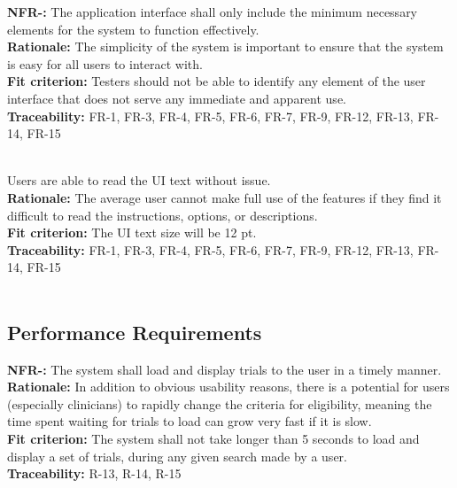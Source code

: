 \documentclass[12pt, titlepage]{article}
\newcounter{NFR_Counter}
\newcounter{FR_Counter}
\begin{document}
\noindent\textbf{NFR-\the\value{NFR_Counter}:}
The application interface shall only include the minimum necessary elements for the system to function effectively. \\
\textbf{Rationale:}
The simplicity of the system is important to ensure that the system is easy for all users to interact with. \\
\textbf{Fit criterion:}
Testers should not be able to identify any element of the user interface that does not serve any immediate and apparent use. \\
\textbf{Traceability:}
FR-1, FR-3, FR-4, FR-5, FR-6, FR-7, FR-9, FR-12, FR-13, FR-14, FR-15 \\~\\
\addtocounter{NFR_Counter}{1}

Users are able to read the UI text without issue. \\
\textbf{Rationale:}
The average user cannot make full use of the features if they find it difficult to read the instructions, options, or descriptions. \\
\textbf{Fit criterion:}
The UI text size will be 12 pt. \\
\textbf{Traceability:}
FR-1, FR-3, FR-4, FR-5, FR-6, FR-7, FR-9, FR-12, FR-13, FR-14, FR-15 \\~\\
\addtocounter{NFR_Counter}{1}


\subsection{Performance Requirements}

\textbf{NFR-\the\value{NFR_Counter}:}
The system shall load and display trials to the user in a timely manner.\\
\textbf{Rationale:}
In addition to obvious usability reasons, there is a potential for users (especially clinicians) to rapidly
change the criteria for eligibility, meaning the time spent waiting for trials to load can grow very fast if it is slow.\\
\textbf{Fit criterion:}
The system shall not take longer than 5 seconds to load and display a set of trials, during any given search made by a user.\\
\textbf{Traceability:}
R-13, R-14, R-15 \\~\\
\addtocounter{NFR_Counter}{1}
\end{document}
